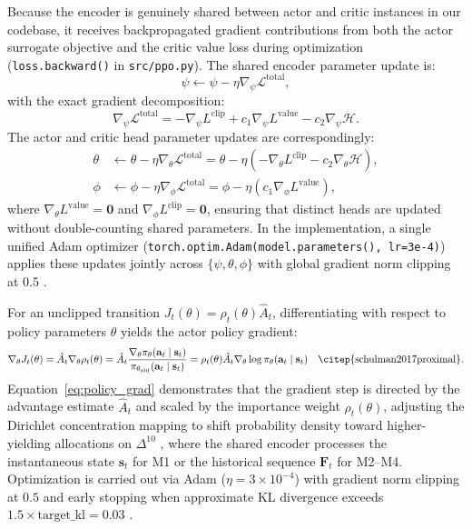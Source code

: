 Because the encoder is genuinely shared between actor and critic instances in our codebase, it receives backpropagated gradient contributions from both the actor surrogate objective and the critic value loss during optimization (\texttt{loss.backward()} in \texttt{src/ppo.py}). The shared encoder parameter update is:
\begin{equation}
\psi \leftarrow \psi - \eta \nabla_\psi \mathcal{L}^{\text{total}},
\label{eq:shared_encoder_update}
\end{equation}
with the exact gradient decomposition:
\begin{equation}
\nabla_\psi \mathcal{L}^{\text{total}} = -\nabla_\psi L^{\text{clip}} + c_1 \nabla_\psi L^{\text{value}} - c_2 \nabla_\psi \mathcal{H}.
\end{equation}
The actor and critic head parameter updates are correspondingly:
\begin{align}
\theta &\leftarrow \theta - \eta \nabla_\theta \mathcal{L}^{\text{total}} = \theta - \eta \left( -\nabla_\theta L^{\text{clip}} - c_2 \nabla_\theta \mathcal{H} \right), \\
\phi &\leftarrow \phi - \eta \nabla_\phi \mathcal{L}^{\text{total}} = \phi - \eta \left( c_1 \nabla_\phi L^{\text{value}} \right),
\end{align}
where $\nabla_\theta L^{\text{value}} = \mathbf{0}$ and $\nabla_\phi L^{\text{clip}} = \mathbf{0}$, ensuring that distinct heads are updated without double-counting shared parameters. In the implementation, a single unified Adam optimizer (\texttt{torch.optim.Adam(model.parameters(), lr=3e-4)}) applies these updates jointly across $\{\psi, \theta, \phi\}$ with global gradient norm clipping at $0.5$ \citep{zou2024novel}.

For an unclipped transition $J_t(\theta) = \rho_t(\theta) \hat{A}_t$, differentiating with respect to policy parameters $\theta$ yields the actor policy gradient:
\begin{equation}
\nabla_\theta J_t(\theta) = \hat{A}_t \nabla_\theta \rho_t(\theta) = \hat{A}_t \frac{\nabla_\theta \pi_\theta(\mathbf{a}_t \mid \mathbf{s}_t)}{\pi_{\theta_{\text{old}}}(\mathbf{a}_t \mid \mathbf{s}_t)} = \rho_t(\theta) \hat{A}_t \nabla_\theta \log \pi_\theta(\mathbf{a}_t \mid \mathbf{s}_t) \quad \text{\citep{schulman2017proximal}}.
\label{eq:policy_grad}
\end{equation}
Equation~\eqref{eq:policy_grad} demonstrates that the gradient step is directed by the advantage estimate $\hat{A}_t$ and scaled by the importance weight $\rho_t(\theta)$, adjusting the Dirichlet concentration mapping to shift probability density toward higher-yielding allocations on $\Delta^{10}$ \citep{yang2022selective}, where the shared encoder processes the instantaneous state $\mathbf{s}_t$ for M1 or the historical sequence $\mathbf{F}_t$ for M2--M4. Optimization is carried out via Adam ($\eta = 3 \times 10^{-4}$) with gradient norm clipping at $0.5$ \citep{zou2024novel} and early stopping when approximate KL divergence exceeds $1.5 \times \text{target\_kl} = 0.03$ \citep{schulman2017proximal}.

